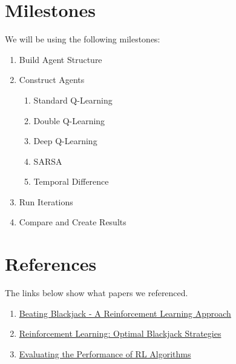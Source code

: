 \documentclass[letterpaper]{article}
\begin{document}
 \section*{Milestones}
 We will be using the following milestones:

 \begin{enumerate}
     \item Build Agent Structure
     \item Construct Agents
     \begin{enumerate}
         \item Standard Q-Learning
         \item Double Q-Learning
         \item Deep Q-Learning
         \item SARSA
         \item Temporal Difference
     \end{enumerate}
     \item Run Iterations
     \item Compare and Create Results
 \end{enumerate}

\section*{References}
The links below show what papers we referenced.
\begin{enumerate}
    \item \href{https://web.stanford.edu/class/aa228/reports/2020/final117.pdf}{Beating Blackjack - A Reinforcement Learning Approach}
    \item \href{https://medium.com/mitb-for-all/reinforcement-learning-optimal-blackjack-strategies-982a5a176d2d}{Reinforcement Learning: Optimal Blackjack Strategies}
    \item \href{https://proceedings.mlr.press/v119/jordan20a/jordan20a.pdf}{Evaluating the Performance of RL Algorithms}
\end{enumerate}
\end{document}
